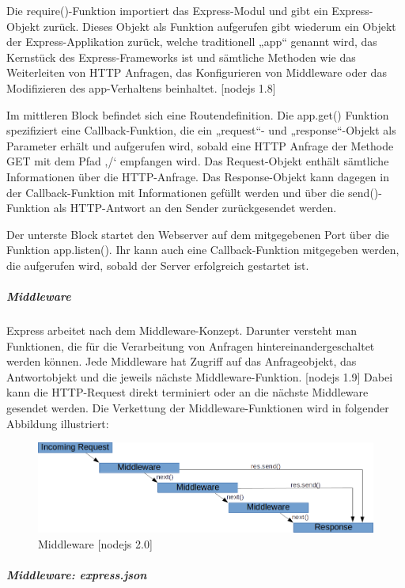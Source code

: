 Die require()-Funktion importiert das Express-Modul und gibt ein Express-Objekt zurück. Dieses Objekt als Funktion aufgerufen gibt wiederum ein Objekt der Express-Applikation zurück, welche traditionell „app“ genannt wird, das Kernstück des Express-Frameworks ist und sämtliche Methoden wie das Weiterleiten von HTTP Anfragen, das Konfigurieren von Middleware oder das Modifizieren des app-Verhaltens beinhaltet. [nodejs 1.8]\newline 

Im mittleren Block befindet sich eine Routendefinition. Die app.get() Funktion spezifiziert eine Callback-Funktion, die ein „request“- und „response“-Objekt als Parameter erhält und aufgerufen wird, sobald eine HTTP Anfrage der Methode GET mit dem Pfad ‚/‘ empfangen wird. Das Request-Objekt enthält sämtliche Informationen über die HTTP-Anfrage. Das Response-Objekt kann dagegen in der Callback-Funktion mit Informationen gefüllt werden und über die send()-Funktion als HTTP-Antwort an den Sender zurückgesendet werden.\newline

Der unterste Block startet den Webserver auf dem mitgegebenen Port über die Funktion app.listen(). Ihr kann auch eine Callback-Funktion mitgegeben werden, die aufgerufen wird, sobald der Server erfolgreich gestartet ist.\newpage

\subparagraph{Middleware}
Express arbeitet nach dem Middleware-Konzept. Darunter versteht man Funktionen, die für die Verarbeitung von Anfragen hintereinandergeschaltet werden können. Jede Middleware hat Zugriff auf das Anfrageobjekt, das Antwortobjekt und die jeweils nächste Middleware-Funktion. [nodejs 1.9]
Dabei kann die HTTP-Request direkt terminiert oder an die nächste Middleware gesendet werden. Die Verkettung der Middleware-Funktionen wird in folgender Abbildung illustriert: \newline

\begin{figure}[h]
\centering
\includegraphics[width=12cm]{images/nodejs_middleware.png}
\caption{Middleware [nodejs 2.0]}
\end{figure}

\subparagraph{Middleware: express.json}

